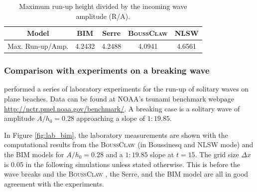 \documentclass[review]{elsarticle}
\newcommand{\BoussClaw}{\textsc{BoussClaw} }
\begin{document}
\begin{table}[!htb]
	\begin{tabular}{c|cccc} \hline
		Model & BIM & Serre & \BoussClaw & NLSW \\ \hline
		Max. Run-up/Amp. & 4.2432 & 4.2488 & 4.0941 & 4.6561 \\
		\hline
	\end{tabular}
	\caption{Maximum run-up height divided by the incoming wave amplitude (R/A).}
    \label{tab:runup_slope10}
\end{table}

 
\subsubsection{Comparison with experiments on a breaking wave}
\label{sec:wave_break}


\citet{synolakis1987runup} performed a series of laboratory experiments for the run-up of solitary waves
on plane beaches. 
Data can be found at 
NOAA's tsunami benchmark webpage \url{http://nctr.pmel.noaa.gov/benchmark/}.
A  breaking case is a solitary wave of amplitude $A/h_0=0.28$ 
approaching a slope of $1:19.85$. 


In Figure \ref{fig:lab_bim}, the laboratory measurements
are shown with the computational results from the \BoussClaw (in Boussinesq and  NLSW mode) and the BIM models
for $A/h_0=0.28$ and a $1:19.85$ slope at $t=15$. 
The grid size $\Delta x$ is 0.05 in the following simulations
unless stated otherwise.
This is before the wave breaks and
the \BoussClaw, the Serre, and the  BIM model are all in good agreement with the experiments.
\end{document}
